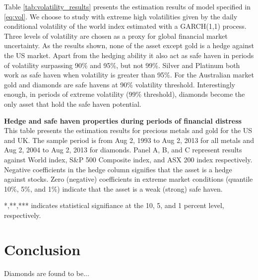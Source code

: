 \documentclass[preprint,authoryear,11pt]{elsarticle}
\begin{document}
Table \ref{tab:volatility_results} presents the estimation results of model specified in \eqref{eq:vol}. We choose to study with extreme high volatilities given by the daily conditional volatility of the world index estimated with a GARCH(1,1) process. Three levels of volatility are chosen as a proxy for global financial market uncertainty. As the results shown, none of the asset except gold is a hedge against the US market. Apart from the hedging ability it also act as safe haven in periods of volatility surpassing 90\% and 95\%, but not 99\%. Silver and Platinum both work as safe haven when volatility is greater than 95\%. For the Australian market gold and diamonds are safe havens at 90\% volatility threshold. Interestingly enough, in periods of extreme volatility (99\% threshold), diamonds become the only asset that hold the safe haven potential.

\begin{table}[htp!]
\centering
\captionsetup{labelfont=bf,font=footnotesize,skip=0.1cm}
\caption{\textbf{Hedge and safe haven properties during periods of financial distress}\\
This table presents the estimation results for precious metals and gold for the US and UK. The sample period is from Aug 2, 1993 to Aug 2, 2013 for all metals and Aug 2, 2004 to Aug 2, 2013 for diamonds. Panel A, B, and C represent results against World index, S\&P 500 Composite index, and ASX 200 index respectively. Negative coefficients in the hedge column signifies that the asset is a hedge against stocks. Zero (negative) coefficients in extreme market conditions (quantile 10\%, 5\%, and 1\%) indicate that the asset is a weak (strong) safe haven.} \label{tab:us_uk_fin_distress}
\begin{threeparttable}

\begin{tablenotes}
\item [*,**,***] indicates statistical signifiance at the 10, 5, and 1 percent level, respectively.
\end{tablenotes}
\end{threeparttable}
\end{table}


\glsresetall
\section{Conclusion}
\label{sec:conclusion}
Diamonds are found to be...



\end{document}
